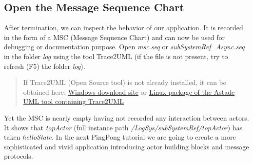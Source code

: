 \subsection{Open the Message Sequence Chart}

After termination, we can inspect the behavior of our application. It is recorded in the form of a MSC (Message Sequence Chart) and can now be used for debugging or documentation purpose. Open \emph{msc.seq} or \emph{subSystemRef\_Async.seq} in the folder \emph{log} using the tool Trace2UML (if the file is not present, try to refresh (F5) the folder \emph{log}).

\begin{quote}
	If Trace2UML (Open Source tool) is not already installed, it can be obtained here: \href{http://trace2uml.tigris.org/servlets/ProjectDocumentList?folderID=6208}{Windows download site} or \href{http://apt.astade.de/}{Linux package of the Astade UML tool containing Trace2UML}
\end{quote}


Yet the MSC is nearly empty having not recorded any interaction between actors. It shows that  \emph{topActor} (full instance path \emph{/LogSys/subSystemRef/topActor}) has taken \emph{helloState}. In the next PingPong tutorial we are going to create a more sophisticated and vivid \eTrice application introducing actor building blocks and message protocols.

